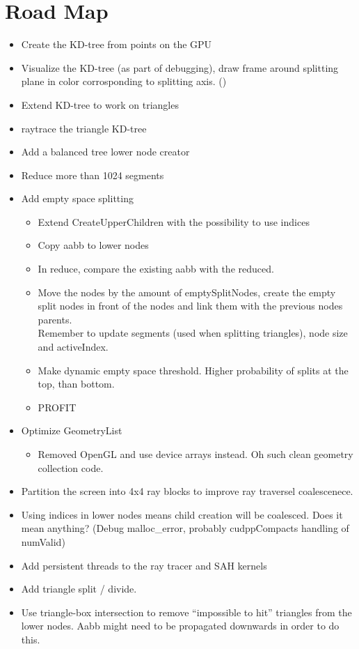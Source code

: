 \section*{Road Map}


\begin{itemize}
\item \color{green}Create the KD-tree from points on the GPU \checkmark
\item Visualize the KD-tree (as part of debugging), draw frame around
  splitting plane in color corrosponding to splitting axis. (\checkmark)
\item Extend KD-tree to work on triangles \checkmark
\item raytrace the triangle KD-tree \checkmark
\item Add a balanced tree lower node creator \checkmark
\item Reduce more than 1024 segments \checkmark
\item Add empty space splitting
  \begin{itemize}
    \item Extend CreateUpperChildren with the possibility to use indices \checkmark
    \item Copy aabb to lower nodes \checkmark
    \item In reduce, compare the existing aabb with the reduced. \checkmark
    \item Move the nodes by the amount of emptySplitNodes, create the
      empty split nodes in front of the nodes and link them with the
      previous nodes parents.\\ Remember to update segments (used when
      splitting triangles), node size and activeIndex. \checkmark
    \item \color{red}Make dynamic empty space threshold. Higher probability of
      splits at the top, than bottom.
    \item PROFIT
  \end{itemize}
\item Optimize GeometryList
  \begin{itemize}
  \item Removed OpenGL and use device arrays instead. Oh such clean
    geometry collection code. \checkmark
  \end{itemize}
\item Partition the screen into 4x4 ray blocks to improve ray
  traversel coalescenece. \checkmark
\color{red}\item Using indices in lower nodes means child creation will be
  coalesced. Does it mean anything? (Debug malloc\_error, probably
  cudppCompacts handling of numValid)
\item Add persistent threads to the ray tracer and SAH kernels
\item Add triangle split / divide.
\item Use triangle-box intersection to remove ``impossible to hit''
  triangles from the lower nodes. Aabb might need to be propagated
  downwards in order to do this.
\end{itemize}

